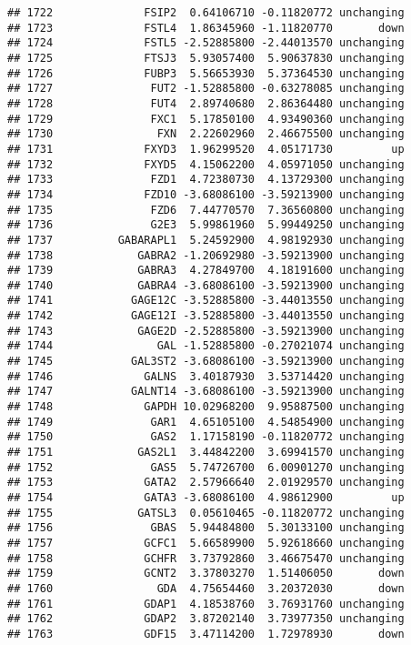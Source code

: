 \documentclass[]{article}
\begin{document}
\begin{verbatim}
## 1722              FSIP2  0.64106710 -0.11820772 unchanging
## 1723              FSTL4  1.86345960 -1.11820770       down
## 1724              FSTL5 -2.52885800 -2.44013570 unchanging
## 1725              FTSJ3  5.93057400  5.90637830 unchanging
## 1726              FUBP3  5.56653930  5.37364530 unchanging
## 1727               FUT2 -1.52885800 -0.63278085 unchanging
## 1728               FUT4  2.89740680  2.86364480 unchanging
## 1729               FXC1  5.17850100  4.93490360 unchanging
## 1730                FXN  2.22602960  2.46675500 unchanging
## 1731              FXYD3  1.96299520  4.05171730         up
## 1732              FXYD5  4.15062200  4.05971050 unchanging
## 1733               FZD1  4.72380730  4.13729300 unchanging
## 1734              FZD10 -3.68086100 -3.59213900 unchanging
## 1735               FZD6  7.44770570  7.36560800 unchanging
## 1736               G2E3  5.99861960  5.99449250 unchanging
## 1737          GABARAPL1  5.24592900  4.98192930 unchanging
## 1738             GABRA2 -1.20692980 -3.59213900 unchanging
## 1739             GABRA3  4.27849700  4.18191600 unchanging
## 1740             GABRA4 -3.68086100 -3.59213900 unchanging
## 1741            GAGE12C -3.52885800 -3.44013550 unchanging
## 1742            GAGE12I -3.52885800 -3.44013550 unchanging
## 1743             GAGE2D -2.52885800 -3.59213900 unchanging
## 1744                GAL -1.52885800 -0.27021074 unchanging
## 1745            GAL3ST2 -3.68086100 -3.59213900 unchanging
## 1746              GALNS  3.40187930  3.53714420 unchanging
## 1747            GALNT14 -3.68086100 -3.59213900 unchanging
## 1748              GAPDH 10.02968200  9.95887500 unchanging
## 1749               GAR1  4.65105100  4.54854900 unchanging
## 1750               GAS2  1.17158190 -0.11820772 unchanging
## 1751             GAS2L1  3.44842200  3.69941570 unchanging
## 1752               GAS5  5.74726700  6.00901270 unchanging
## 1753              GATA2  2.57966640  2.01929570 unchanging
## 1754              GATA3 -3.68086100  4.98612900         up
## 1755             GATSL3  0.05610465 -0.11820772 unchanging
## 1756               GBAS  5.94484800  5.30133100 unchanging
## 1757              GCFC1  5.66589900  5.92618660 unchanging
## 1758              GCHFR  3.73792860  3.46675470 unchanging
## 1759              GCNT2  3.37803270  1.51406050       down
## 1760                GDA  4.75654460  3.20372030       down
## 1761              GDAP1  4.18538760  3.76931760 unchanging
## 1762              GDAP2  3.87202140  3.73977350 unchanging
## 1763              GDF15  3.47114200  1.72978930       down

\end{verbatim}
\end{document}
